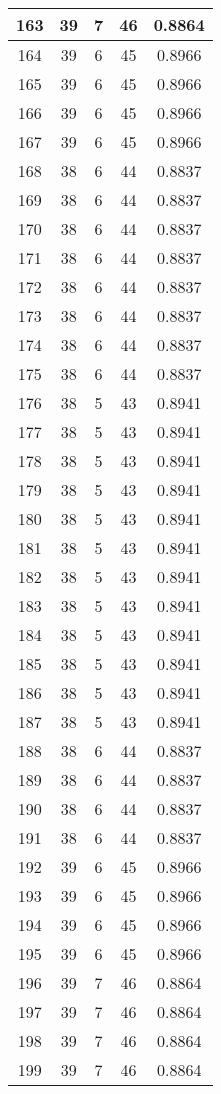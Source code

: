 \documentclass[letterpaper, 12pt]{article}
\begin{document}
\begin{longtable}{|c|c|c|c|c|}
\hline
163 & 39 & 7 & 46 & 0.8864 \\
\hline
164 & 39 & 6 & 45 & 0.8966 \\
\hline
165 & 39 & 6 & 45 & 0.8966 \\
\hline
166 & 39 & 6 & 45 & 0.8966 \\
\hline
167 & 39 & 6 & 45 & 0.8966 \\
\hline
168 & 38 & 6 & 44 & 0.8837 \\
\hline
169 & 38 & 6 & 44 & 0.8837 \\
\hline
170 & 38 & 6 & 44 & 0.8837 \\
\hline
171 & 38 & 6 & 44 & 0.8837 \\
\hline
172 & 38 & 6 & 44 & 0.8837 \\
\hline
173 & 38 & 6 & 44 & 0.8837 \\
\hline
174 & 38 & 6 & 44 & 0.8837 \\
\hline
175 & 38 & 6 & 44 & 0.8837 \\
\hline
176 & 38 & 5 & 43 & 0.8941 \\
\hline
177 & 38 & 5 & 43 & 0.8941 \\
\hline
178 & 38 & 5 & 43 & 0.8941 \\
\hline
179 & 38 & 5 & 43 & 0.8941 \\
\hline
180 & 38 & 5 & 43 & 0.8941 \\
\hline
181 & 38 & 5 & 43 & 0.8941 \\
\hline
182 & 38 & 5 & 43 & 0.8941 \\
\hline
183 & 38 & 5 & 43 & 0.8941 \\
\hline
184 & 38 & 5 & 43 & 0.8941 \\
\hline
185 & 38 & 5 & 43 & 0.8941 \\
\hline
186 & 38 & 5 & 43 & 0.8941 \\
\hline
187 & 38 & 5 & 43 & 0.8941 \\
\hline
188 & 38 & 6 & 44 & 0.8837 \\
\hline
189 & 38 & 6 & 44 & 0.8837 \\
\hline
190 & 38 & 6 & 44 & 0.8837 \\
\hline
191 & 38 & 6 & 44 & 0.8837 \\
\hline
192 & 39 & 6 & 45 & 0.8966 \\
\hline
193 & 39 & 6 & 45 & 0.8966 \\
\hline
194 & 39 & 6 & 45 & 0.8966 \\
\hline
195 & 39 & 6 & 45 & 0.8966 \\
\hline
196 & 39 & 7 & 46 & 0.8864 \\
\hline
197 & 39 & 7 & 46 & 0.8864 \\
\hline
198 & 39 & 7 & 46 & 0.8864 \\
\hline
199 & 39 & 7 & 46 & 0.8864 \\
\hline
\end{longtable}
\end{document}
